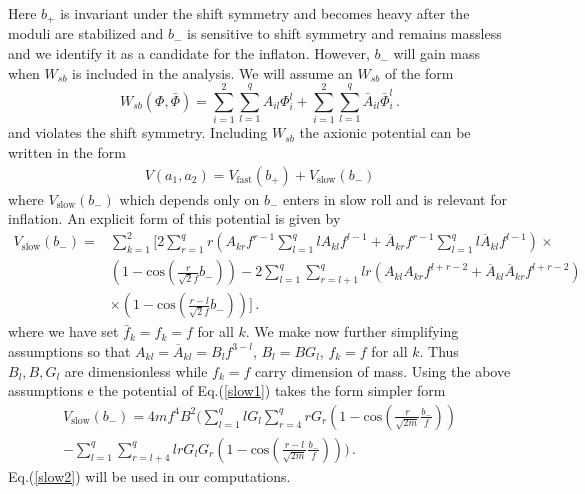 \documentclass[12pt]{article}
\begin{document}
Here $b_+$ is invariant under the shift symmetry and becomes heavy after the moduli are stabilized and $b_-$ is sensitive
to shift symmetry and remains massless and we identify it as a candidate for the inflaton. However, $b_-$ will gain mass
when $W_{sb}$ is included in the analysis.  We will assume an $W_{sb}$ of the form
\begin{equation}
  W_{sb} \left( \Phi,\bar \Phi \right) =
  \sum_{i= 1}^{2} \sum_{l = 1}^{q} {A}_{i  l} {\Phi}_{i}^{l} + \sum_{i = 1}^{2} \sum_{l = 1}^{q} {\bar{A}}_{i  l} {\bar{\Phi}}_{i}^{l}\,.
  \label{wsn1}
\end{equation}
and violates the shift symmetry. Including $W_{sb}$ the axionic potential can be written in the form
\begin{align}
  V(a_1,a_2) = V_{\text{fast}}(b_+) + V_{\text{slow}}(b_-)
\end{align}
where $V_{\text{slow}}(b_-)$ which depends only on $b_-$ enters in slow roll and is relevant for inflation.
An explicit form of this potential is given by
\begin{align}
  {V}_{\text{slow}} (b_-) = & \sum_{k = 1}^{2} \Big[ 2 \sum_{r = 1}^{q} r  \left( {A}_{k  r} {f}^{r - 1}  \sum_{l = 1}^{q} l  {A}_{k  l} {f}^{l - 1} + {\overline{A}}_{k  r}  {{f}}^{r - 1} \sum_{l = 1}^{q} l  \overline{{A}}_{k  l} {{f}}^{l - 1} \right) \times \nonumber\\
                            & \left( 1 - \text{cos} \left( \frac{r}{ \sqrt 2 f}
    {b}_{-}\right) \right)
    - 2 \sum_{l = 1}^{q} \sum_{r = l + 1}^{q} l  r  \left( {A}_{k  l} {A}_{k  r} {f}^{l + r - 2} + {\overline{A}}_{k  l} {\overline{A}}_{k  r} {{f}}^{l + r - 2} \right)\nonumber\\
                            & \times \left( 1 - \text{cos} \left( \frac{r - l}{\sqrt 2 f } {b}_{-}\right) \right) \Big]\,.
  \label{slow1}
\end{align}
where we have set $\bar f_k=f_k=f$ for all $k$.
We make now further  simplifying assumptions so that
${A}_{k  l} = {\overline{A}}_{k  l} = {B}_{l} {f}^{3 - l}$, ${B}_{l} = B  {G}_{l}$,  ${f}_{k} = f$  for all $k$. Thus $B_l, B, G_l$ are dimensionless while $f_k=f$ carry dimension of mass. Using the above assumptions
e the potential of Eq.(\ref{slow1}) takes the form simpler form
\begin{equation}
  \begin{aligned}
    {V}_{\text{slow}} \left( {b}_{-} \right) =
    4 m  {f}^{4} {B}^{2}  \Big( \sum_{l = 1}^{q} l  {G}_{l}  \sum_{r = 4}^{q} r  {G}_{r}  \left( 1 - \text{cos} \left( \frac{r}{\sqrt{2 m}} \frac{{b}_{-}}{f} \right) \right) \\
    - \sum_{l = 1}^{q} \sum_{r = l + 4}^{q} l  r  {G}_{l} {G}_{r}  \left( 1 - \text{cos} \left( \frac{r - l}{\sqrt{2 m}} \frac{{b}_{-}}{f} \right) \right) \Big)\,.
    \label{slow2}
  \end{aligned}
\end{equation}
Eq.(\ref{slow2}) will be used  in our computations.\\
\end{document}
